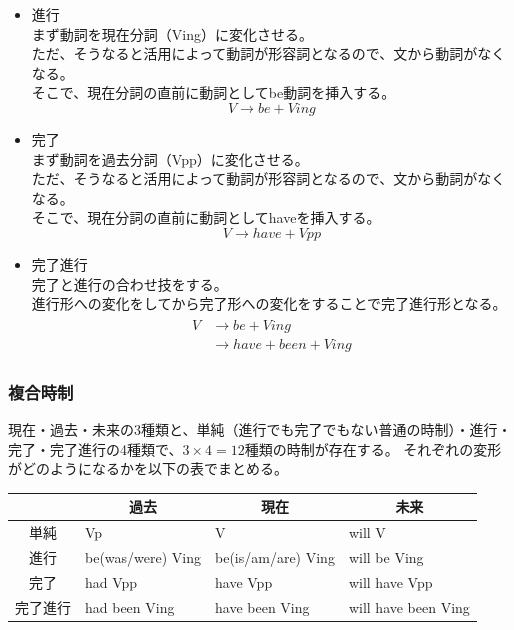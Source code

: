 \documentclass[11pt,a4paper,titlepage]{jsarticle}
\begin{document}
\begin{itemize}
  \item 進行\\
  まず動詞を現在分詞（Ving）に変化させる。\\
  ただ、そうなると活用によって動詞が形容詞となるので、文から動詞がなくなる。\\
  そこで、現在分詞の直前に動詞としてbe動詞を挿入する。\\
  \begin{equation}
    V \rightarrow be + Ving
  \end{equation}
  \item 完了\\
  まず動詞を過去分詞（Vpp）に変化させる。\\
  ただ、そうなると活用によって動詞が形容詞となるので、文から動詞がなくなる。\\
  そこで、現在分詞の直前に動詞としてhaveを挿入する。\\
  \begin{equation}
    V \rightarrow have + Vpp
  \end{equation}
  \item 完了進行\\
  完了と進行の合わせ技をする。\\
  進行形への変化をしてから完了形への変化をすることで完了進行形となる。\\
  \begin{align}
    \begin{aligned}
      V & \rightarrow be + Ving\\
        & \rightarrow have + been + Ving
    \end{aligned}
  \end{align}
\end{itemize}

\subsubsection{複合時制}

現在・過去・未来の3種類と、単純（進行でも完了でもない普通の時制）・進行・完了・完了進行の4種類で、$3 \times 4 = 12$種類の時制が存在する。
それぞれの変形がどのようになるかを以下の表でまとめる。

\begin{table}[h]
  \centering
  \begin{tabular}{clll}
    \hline
     & \multicolumn{1}{c}{過去} & \multicolumn{1}{c}{現在} & \multicolumn{1}{c}{未来}\\
    \hline \hline
    単純 & Vp & V & will V\\
    進行 & be(was/were) Ving & be(is/am/are) Ving & will be Ving\\
    完了 & had Vpp & have Vpp & will have Vpp\\
    完了進行 & had been Ving & have been Ving & will have been Ving\\
    \hline
  \end{tabular}
\end{table}
\end{document}

